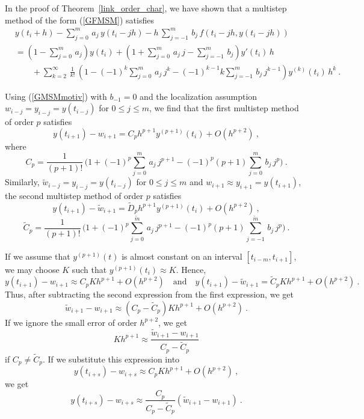 In the proof of Theorem~\ref{link_order_char}, we have shown that a
multistep method of the form (\ref{GFMSM}) satisfies
\begin{align}
& y(t_i+h) - \sum_{j=0}^m\,a_j\,y(t_i-jh)
-h\,\sum_{j=-1}^m\,b_j\,f(t_i-jh,y(t_i-jh)) \nonumber \\
&= \left( 1 - \sum_{j=0}^m\,a_j \right) y(t_i)
+ \left( 1 + \sum_{j=0}^m\,a_j\,j - \sum_{j=-1}^m\,b_j\right) y'(t_i)\,h
\nonumber \\
&\qquad
+ \sum_{k=2}^\infty\,\frac{1}{k!}\,\left( 1 - (-1)^k \sum_{j=0}^m\,a_j\,j^k
- (-1)^{k-1} k \sum_{j=-1}^m\,b_j\, j^{k-1}\right) y^{(k)}(t_i)\,h^k \ .
\label{GMSMmotiv}
\end{align}

Using (\ref{GMSMmotiv}) with $b_{-1}=0$ and the localization assumption 
$w_{i-j} = y_{i-j} = y(t_{i-j})$ for $0 \leq j \leq m$, we find that
the first multistep method of order $p$ satisfies
\begin{equation} \label{VSSE1}
y(t_{i+1}) - w_{i+1} = C_p h^{p+1} y^{(p+1)}(t_i) + O(h^{p+2}) \ ,
\end{equation}
where
\[
C_p = \frac{1}{(p+1)!}\,\bigg( 1 + (-1)^p \sum_{j=0}^m\,a_j\,j^{p+1}
- (-1)^p (p+1) \sum_{j=0}^m\,b_j\, j^p\bigg) \ .
\]
Similarly, $\tilde{w}_{i-j} = y_{i-j} = y(t_{i-j})$ for $0 \leq j \leq m$
and $w_{i+1} \approx y_{i+1} = y(t_{i+1})$, the second multistep method of
order $p$ satisfies
\begin{equation} \label{VSSE2}
y(t_{i+1}) - \tilde{w}_{i+1} = \tilde{D}_p h^{p+1} y^{(p+1)}(t_i) + O(h^{p+2})
\ ,
\end{equation}
\[
\tilde{C}_p = \frac{1}{(p+1)!}\,\bigg( 1
+ (-1)^p \sum_{j=0}^{\tilde{m}}\,a_j\,j^{p+1}
- (-1)^p (p+1) \sum_{j=-1}^{\tilde{m}}\,b_j\, j^p\bigg) \ .
\]

If we assume that $y^{(p+1)}(t)$ is almost constant on an interval
$[t_{i-m},t_{i+1}]$, we may choose $K$ such that
$y^{(p+1)}(t_i) \approx K$.  Hence,
\[
y(t_{i+1}) - w_{i+1} \approx C_p K h^{p+1} + O(h^{p+2})
\quad\text{and} \quad
y(t_{i+1}) - \tilde{w}_{i+1} = \tilde{C}_p K h^{p+1} + O(h^{p+2}) \ .
\]
Thus, after subtracting the second expression from the first
expression, we get
\[
\tilde{w}_{i+1} - w_{i+1} \approx
(C_p - \tilde{C}_p) K h^{p+1} + O(h^{p+2}) \ .
\]
If we ignore the small error of order $h^{p+2}$, we get
\[
K h^{p+1} \approx \frac{\displaystyle \tilde{w}_{i+1} - w_{i+1}}
{\displaystyle C_p - \tilde{C}_p}
\]
if $ C_p \neq \tilde{C}_p$.  If we substitute this expression into
\[
  y(t_{i+s}) - w_{i+s} \approx C_p K h^{p+1} + O(h^{p+2}) \ ,
\]
we get
\begin{equation} \label{MSvssLocalError}
y(t_{i+s}) - w_{i+s} \approx \frac{C_p}{C_p-\tilde{C}_p}
\left( \tilde{w}_{i+1} - w_{i+1} \right) \ .
\end{equation}

